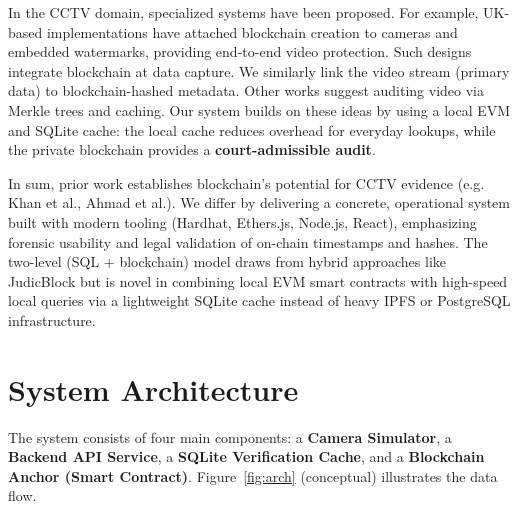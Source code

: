 \documentclass[conference]{IEEEtran}
\begin{document}
In the CCTV domain, specialized systems have been proposed. For example, UK-based implementations have attached blockchain creation to cameras and embedded watermarks, providing end-to-end video protection. Such designs integrate blockchain at data capture. We similarly link the video stream (primary data) to blockchain-hashed metadata. Other works suggest auditing video via Merkle trees and caching. Our system builds on these ideas by using a local EVM and SQLite cache: the local cache reduces overhead for everyday lookups, while the private blockchain provides a \textbf{court-admissible audit}.

In sum, prior work establishes blockchain's potential for CCTV evidence (e.g. Khan et al., Ahmad et al.). We differ by delivering a concrete, operational system built with modern tooling (Hardhat, Ethers.js, Node.js, React), emphasizing forensic usability and legal validation of on-chain timestamps and hashes. The two-level (SQL + blockchain) model draws from hybrid approaches like JudicBlock but is novel in combining local EVM smart contracts with high-speed local queries via a lightweight SQLite cache instead of heavy IPFS or PostgreSQL infrastructure.

\section{System Architecture}

The system consists of four main components: a \textbf{Camera Simulator}, a \textbf{Backend API Service}, a \textbf{SQLite Verification Cache}, and a \textbf{Blockchain Anchor (Smart Contract)}. Figure~\ref{fig:arch} (conceptual) illustrates the data flow.
\end{document}
